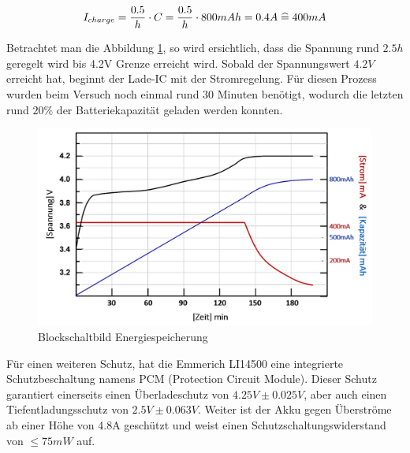 \begin{equation}
\centering
I_{charge}={\frac{0.5}{h} \cdot C}={\frac{0.5}{h} \cdot 800mAh}=0.4A\thickspace \widehat {=} \thickspace 400mA
\label{eq:Ladestrom}
\end{equation}

Betrachtet man die Abbildung \ref{fig:Ladekurve Li-Ion Akku}, so wird ersichtlich, dass die Spannung rund $2.5h$ geregelt wird bis 4.2V Grenze erreicht wird. Sobald der Spannungswert $4.2V$ erreicht hat, beginnt der Lade-IC mit der Stromregelung. Für diesen Prozess wurden beim Versuch noch einmal rund 30 Minuten benötigt, wodurch die letzten rund $20\%$ der Batteriekapazität geladen werden konnten.

\begin{figure}[H]
	\begin{center}
		\includegraphics[width=120mm]{data/LadekurveLiIon.png}
		\caption[Blockschaltbild Energiespeicherung]{Blockschaltbild Energiespeicherung} %
		\label{fig:Ladekurve Li-Ion Akku}
	\end{center}
\end{figure}


Für einen weiteren Schutz, hat die Emmerich LI14500 eine integrierte Schutzbeschaltung namens PCM (Protection Circuit Module). Dieser Schutz garantiert einerseits einen Überladeschutz von $4.25V\pm 0.025V$, aber auch einen Tiefentladungsschutz von $2.5V\pm 0.063V$. Weiter ist der Akku gegen Überströme ab einer Höhe von 4.8A geschützt und weist einen Schutzschaltungswiderstand von $\leq 75mW$ auf.
